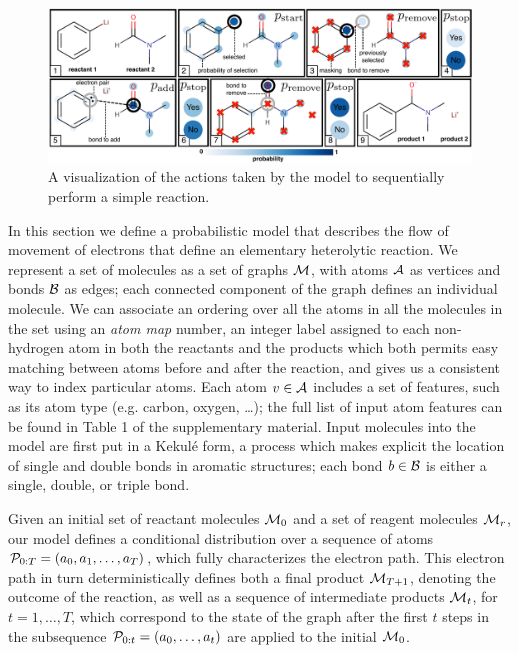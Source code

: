 



\begin{figure}
\centering
\includegraphics[width=\textwidth]{reaction_model_blue}
\caption{A visualization of the actions taken by the model to sequentially perform a simple reaction.}
\label{fig:reaction_model}
\end{figure}



In this section we define a probabilistic model that describes the flow of movement of electrons that define an elementary heterolytic reaction.
We represent a set of molecules as a set of graphs ${\mathcal{M}}$, with atoms ${\mathcal{A}}$ as vertices and bonds ${\mathcal{B}}$ as edges;
each connected component of the graph defines an individual molecule.
We can associate an ordering over all the atoms in all the molecules in the set using an {\em atom map} number,
an integer label assigned to each non-hydrogen atom in both the reactants and the products which 
both permits easy matching between atoms before and after the reaction, and
gives us a consistent way to index particular atoms.
Each atom $v \in {\mathcal{A}}$ includes a set of features, such as its atom type (e.g. carbon, oxygen, \dots); the full list of input atom features can be found in Table 1 of the supplementary material.
Input molecules into the model are first put in a Kekul\'e form, a process which makes explicit the location of single and double bonds in aromatic structures;
each bond $b \in {\mathcal{B}}$ is either a single, double, or triple bond.


Given an initial set of reactant molecules ${\mathcal{M}}_0$ and a set of reagent molecules ${\mathcal{M}}_r$, 
our model defines a conditional distribution over a sequence of atoms ${\mathcal{P}}_{0:T} = (a_0, a_1, \ldots, a_T)$,
which fully characterizes the electron path.
This electron path in turn deterministically defines both a final product ${\mathcal{M}}_{T+1}$, 
denoting the outcome of the reaction,
as well as a sequence of intermediate products ${\mathcal{M}}_t$, for $t = 1,\dots,T$,
which correspond to the state of the graph after the first $t$ steps in the subsequence ${\mathcal{P}}_{0:t} = (a_0, \dots, a_t)$ are applied to the initial ${\mathcal{M}}_0$.


